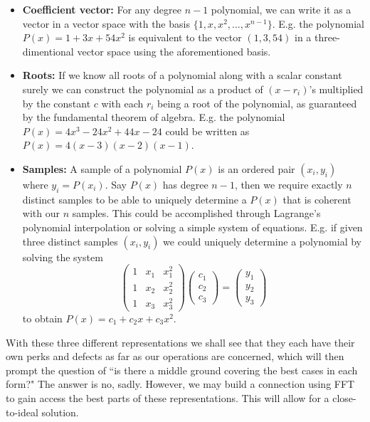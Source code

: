 \documentclass[12pt]{article}
\begin{document}
\begin{itemize}
\item{\textbf{Coefficient vector:}} For any degree $n-1$ polynomial, we can write it as a vector in a vector space with the basis $\{1, x, x^2, ..., x^{n-1}\}$. E.g. the polynomial $P(x) = 1+3x+54x^2$ is equivalent to the vector $(1,3,54)$ in a three-dimentional vector space using the aforementioned basis.

\item{\textbf{Roots:}} If we know all roots of a polynomial along with a scalar constant surely we can construct the polynomial as a product of $(x-r_i)$'s multiplied by the constant $c$ with each $r_i$ being a root of the polynomial, as guaranteed by the fundamental theorem of algebra. E.g. the polynomial $P(x) = 4x^3-24x^2+44x-24$ could be written as $P(x) = 4(x-3)(x-2)(x-1)$.

\item{\textbf{Samples:}} A sample of a polynomial $P(x)$ is an ordered pair $(x_i,y_i)$ where $y_i = P(x_i)$. Say $P(x)$ has degree $n-1$, then we require exactly $n$ distinct samples to be able to uniquely determine a $P(x)$ that is coherent with our $n$ samples. This could be accomplished through Lagrange's polynomial interpolation or solving a simple system of equations. E.g. if given three distinct samples $(x_i,y_i)$ we could uniquely determine a polynomial by solving the system
\begin{equation*}
\begin{pmatrix}
1 & x_1 & x_1^2\\ 
1 & x_2 & x_2^2\\ 
1 & x_3 & x_3^2
\end{pmatrix}
\begin{pmatrix}
c_1\\ 
c_2\\ 
c_3
\end{pmatrix}
=
\begin{pmatrix}
y_1\\ 
y_2\\ 
y_3
\end{pmatrix}
\end{equation*}
to obtain $P(x) = c_1+c_2x+c_3x^2$.
\end{itemize}
With these three different representations we shall see that they each have their own perks and defects as far as our operations are concerned, which will then prompt the question of ``is there a middle ground covering the best cases in each form?" The answer is no, sadly. However, we may build a connection using FFT to gain access the best parts of these representations. This will allow for a close-to-ideal solution.
\end{document}
